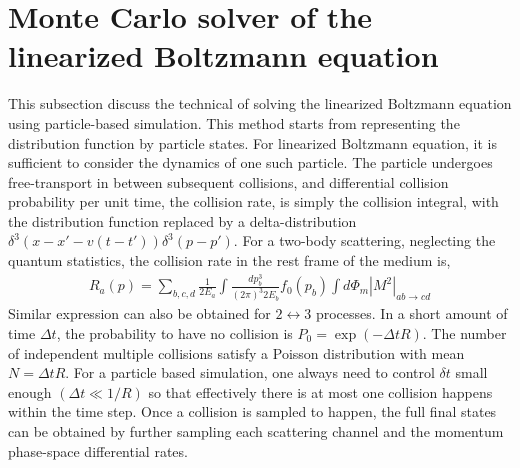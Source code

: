 \section{Monte Carlo solver of the linearized Boltzmann equation}
This subsection discuss the technical of solving the linearized Boltzmann equation using particle-based simulation.
This method starts from representing the distribution function by particle states. 
For linearized Boltzmann equation, it is sufficient to consider the dynamics of one such particle.
The particle undergoes free-transport in between subsequent collisions, and differential collision probability per unit time, the collision rate, is simply the collision integral, with the distribution function replaced by a delta-distribution $\delta^{3}(x-x'- v(t-t')) \delta^3(p-p')$.
For a two-body scattering, neglecting the quantum statistics, the collision rate in the rest frame of the medium is,
\begin{eqnarray}
R_a(p) = \sum_{b,c,d}\frac{1}{2E_a}\int \frac{dp_b^3}{(2\pi)^3 2E_b} f_0(p_b) \int d\Phi_m |M^2|_{ab\rightarrow cd}
\end{eqnarray}
Similar expression can also be obtained for $2\leftrightarrow 3$ processes.
In a short amount of time $\Delta t$, the probability to have no collision is $P_{0} = \exp(-\Delta t R)$.
The number of independent multiple collisions satisfy a Poisson distribution with mean $N = \Delta t R$. 
For a particle based simulation, one always need to control $\delta t$ small enough $(\Delta t \ll 1/R)$ so that effectively there is at most one collision happens within the time step.
Once a collision is sampled to happen, the full final states can be obtained by further sampling each scattering channel and the momentum phase-space differential rates.

